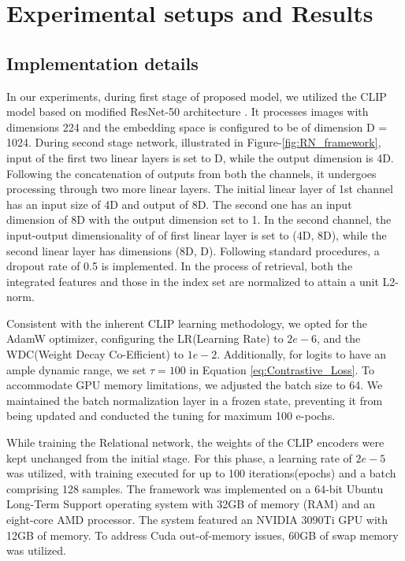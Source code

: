 \documentclass[10pt,lineno]{wlpeerj}
\begin{document}
\color{black}

\section{Experimental setups and Results}\label{sec:experimentation_and_results}
\subsection*{Implementation details}

In our experiments, during first stage of proposed model, we utilized the CLIP model based on modified ResNet-50 architecture \citep{CLIP}. It processes images with dimensions 224 and the embedding space is configured to be of dimension D = 1024.
During second stage network, illustrated in Figure-\ref{fig:RN_framework}, input of the first two linear layers is set to D, while the output dimension is 4D. Following the concatenation of outputs from both the channels, it undergoes processing through two more linear layers. The initial linear layer of 1st channel has an input size of 4D and output of 8D. The second one has an input dimension of 8D with the output dimension set to 1. In the second channel, the input-output dimensionality of of first linear layer is set to (4D, 8D), while the second linear layer has dimensions (8D, D). Following standard procedures, a dropout rate of 0.5 is implemented. In the process of retrieval, both the integrated features and those in the index set are normalized to attain a unit L2-norm.

Consistent with the inherent CLIP learning methodology, we opted for the AdamW optimizer, configuring the LR(Learning Rate) to $2e-6$, and the WDC(Weight Decay Co-Efficient) to $1e-2$. Additionally, for logits to have an ample dynamic range, we set $\tau = 100$ in Equation \ref{eq:Contrastive_Loss}. To accommodate GPU memory limitations, we adjusted the batch size to 64. We maintained the batch normalization layer in a frozen state, preventing it from being updated and conducted the tuning for maximum 100 e-pochs. 

While training the Relational network, the weights of the CLIP encoders were kept unchanged from the initial stage. For this phase, a learning rate of $2e-5$ was utilized, with training executed for up to 100 iterations(epochs) and a batch comprising 128 samples. The framework was implemented on a 64-bit Ubuntu Long-Term Support operating system with 32GB of memory (RAM) and an eight-core AMD processor. The system featured an NVIDIA 3090Ti GPU with 12GB of memory. To address Cuda out-of-memory issues, 60GB of swap memory was utilized.
\end{document}
